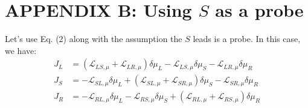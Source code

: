 \section{APPENDIX B: Using $S$ as a probe}

Let's use Eq. (2) along with the assumption the $S$ leads is a probe. In this case, we have:
\begin{align}\label{JL}
J_{L}&=
(\mathcal{L}_{LS,\mu}+\mathcal{L}_{LR,\mu} )\delta\mu_{L}
-\mathcal{L}_{LS,\mu}\delta\mu_{S}
-\mathcal{L}_{LR,\mu}\delta\mu_{R}
\\\label{JS}
J_{S}&=
-\mathcal{L}_{SL,\mu}\delta\mu_{L}
+
(\mathcal{L}_{SL,\mu}+\mathcal{L}_{SR,\mu})\delta\mu_{S}
-
\mathcal{L}_{SR,\mu}\delta\mu_{R}
\\\label{JR}
J_{R}&= 
-\mathcal{L}_{RL,\mu}\delta\mu_{L} 
-\mathcal{L}_{RS,\mu}\delta\mu_{S}
+
(\mathcal{L}_{RL,\mu}+\mathcal{L}_{RS,\mu})\delta\mu_{R}
\end{align}

